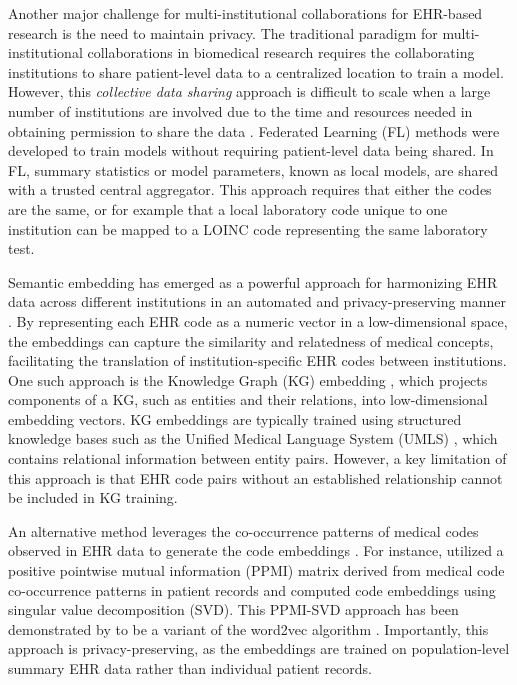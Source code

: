 \documentclass{article}
\begin{document}
Another major challenge for multi-institutional collaborations for EHR-based research is the need to maintain privacy. The traditional paradigm for multi-institutional collaborations in biomedical research requires the collaborating institutions to share patient-level data to a centralized location to train a model. However, this \textit{collective data sharing} approach is difficult to scale when a large number of institutions are involved due to the time and resources needed in obtaining permission to share the data \citep{chen2016privacy}. Federated Learning (FL) methods \citep{Federated_learning, dou_fed, molaei2024federated} were developed to train models without requiring patient-level data being shared. In FL, summary statistics or model parameters, known as local models, are shared with a trusted central aggregator. This approach requires that either the codes are the same, or for example that a local laboratory code unique to one institution can be mapped to a LOINC code representing the same laboratory test.  

Semantic embedding has emerged as a powerful approach for harmonizing EHR data across different institutions in an automated and privacy-preserving manner \citep{bengio2000neural, mikolov2013distributed,pennington2014glove}. By representing each EHR code as a numeric vector in a low-dimensional space, the embeddings can capture the similarity and relatedness of medical concepts,  facilitating the translation of institution-specific EHR codes between institutions. One such approach is the Knowledge Graph (KG) embedding \cite{wang2014knowledge,balavzevic2019tucker,yao2019kg,yuan2022coder,Yucong_disease}, which projects components of a KG, such as entities and their relations, into low-dimensional embedding vectors. KG embeddings are typically trained using structured knowledge bases such as the Unified Medical Language System (UMLS) \cite{UMLS}, which contains relational information between entity pairs. However, a key limitation of this approach is that EHR code pairs without an established relationship cannot be included in KG training. 

An alternative method leverages the co-occurrence patterns of medical codes observed in EHR data to generate the code embeddings  \cite{choi2016multi,kartchner2017code2vec,hong2021clinical,gan2023arch}. For instance, \cite{gan2023arch} utilized a positive pointwise mutual information (PPMI) matrix derived from medical code co-occurrence patterns in patient records and computed code embeddings using singular value decomposition (SVD). This PPMI-SVD approach has been demonstrated by \cite{levy2014neural} to be a variant of the word2vec algorithm \citep{mikolov2013distributed}.
Importantly, this approach is privacy-preserving, as the embeddings are trained on population-level summary EHR data rather than individual patient records. 
\end{document}

